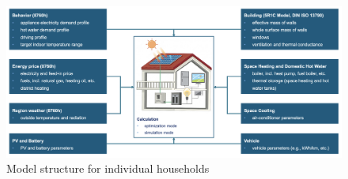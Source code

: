 


%


\begin{figure}[h]
  \centering
  \includegraphics[width=\textwidth]{Images/flex-operation.png}
  \caption{Model structure for individual households}
  \label{fig:flex-operation}
\end{figure}

